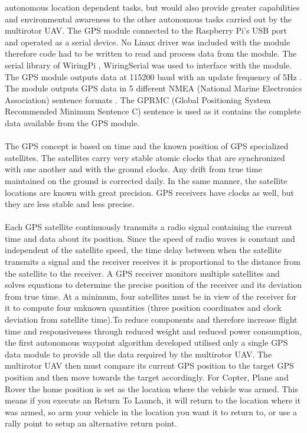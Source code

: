 \documentclass[12pt,a4paper]{report}
\begin{document}
autonomous location dependent tasks, but would also provide greater capabilities and
environmental awareness to the other autonomous tasks carried out by the multirotor UAV.
The GPS module connected to the Raspberry Pi’s USB port and operated as a serial device. No Linux
driver was included with the module therefore code had to be written to read and process data from
the module. The serial library of WiringPi , WiringSerial was used to interface
with the module. The GPS module outputs data at 115200 baud with an update frequency of 5Hz
. The module outputs GPS data in 5 different NMEA (National Marine Electronics Association)
sentence formats . The GPRMC (Global Positioning System Recommended Minimum
Sentence C) sentence is used as it contains the complete data available from the GPS module.\\\\
\hspace*{1cm}
The GPS concept is based on time and the known position of GPS specialized satellites. The satellites carry very stable atomic clocks that are synchronized with one another and with the ground clocks. Any drift from true time maintained on the ground is corrected daily. In the same manner, the satellite locations are known with great precision. GPS receivers have clocks as well, but they are less stable and less precise.
\\\\
\hspace*{1cm}
Each GPS satellite continuously transmits a radio signal containing the current time and data about its position. Since the speed of radio waves is constant and independent of the satellite speed, the time delay between when the satellite transmits a signal and the receiver receives it is proportional to the distance from the satellite to the receiver. A GPS receiver monitors multiple satellites and solves equations to determine the precise position of the receiver and its deviation from true time. At a minimum, four satellites must be in view of the receiver for it to compute four unknown quantities (three position coordinates and clock deviation from satellite time).To reduce components and therefore increase flight time and responsiveness through reduced
weight and reduced power consumption, the first autonomous waypoint algorithm developed
utilised only a single GPS data module to provide all the data required by the multirotor UAV. The
multirotor UAV then must compare its current GPS position to the target GPS position and then
move towards the target accordingly.
 For Copter, Plane and Rover the home position is set as the location where the vehicle was armed. This means if you execute an Return To Launch, it will return to the location where it was armed, so arm your vehicle in the location you want it to return to, or use a rally point to setup an alternative return point. 
\end{document}
